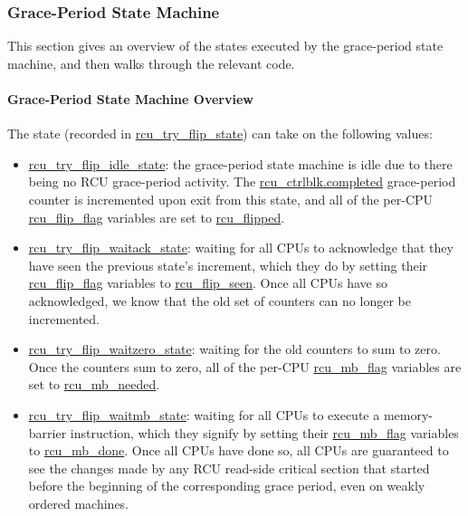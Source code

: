 \subsubsection{Grace-Period State Machine}
\label{app:rcuimpl:Grace-Period State Machine}

This section gives an overview of the states executed by the grace-period
state machine, and then walks through the relevant code.

\paragraph{Grace-Period State Machine Overview}
\label{app:rcuimpl:Grace-Period State Machine Overview}

The state (recorded in \url{rcu_try_flip_state})
can take on the following values:

\begin{itemize}
\item	\url{rcu_try_flip_idle_state}:  the grace-period state
	machine is idle due to there being no RCU grace-period activity.
	The \url{rcu_ctrlblk.completed} grace-period counter
	is incremented upon exit from this state, and all of the
	per-CPU \url{rcu_flip_flag} variables are set
	to \url{rcu_flipped}.

\item	\url{rcu_try_flip_waitack_state}:
	waiting for all CPUs to acknowledge that they have seen the
	previous state's increment, which they do by setting their
	\url{rcu_flip_flag} variables to \url{rcu_flip_seen}.
	Once all CPUs have so acknowledged, we know that the old
	set of counters can no longer be incremented.

\item	\url{rcu_try_flip_waitzero_state}:
	waiting for the old counters to sum to zero.
	Once the counters sum to zero, all of the per-CPU
	\url{rcu_mb_flag} variables are set to
	\url{rcu_mb_needed}.

\item	\url{rcu_try_flip_waitmb_state}:
	waiting for all CPUs to execute a memory-barrier instruction,
	which they signify by setting their \url{rcu_mb_flag}
	variables to \url{rcu_mb_done}.
	Once all CPUs have done so, all CPUs are guaranteed to see
	the changes made by any RCU read-side critical section that
	started before the beginning of the corresponding grace period,
	even on weakly ordered machines.
\end{itemize}

